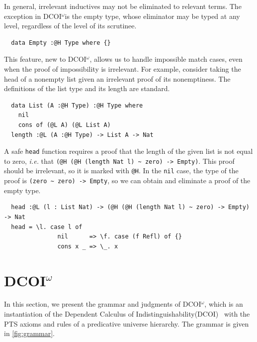 \documentclass[acmsmall]{acmart}
\makeatletter
\theoremstyle{linked}
\theoremstyle{deflinked}
\theoremstyle{acmdefinition}
\newcommand{\dcoi}{DCOI\@\xspace}
\newcommand{\name}{\texorpdfstring{DCOI$^{\omega}$\@\xspace}{DCOI-omega}}
\newcommand{\longname}{Dependent Calculus of Indistinguishability\@\xspace}
\makeatother
\begin{document}
In general, irrelevant inductives may not be eliminated to relevant terms.
The exception in \name is the empty type,
whose eliminator may be typed at any level,
regardless of the level of its scrutinee.
\begin{lstlisting}
  data Empty :@H Type where {}
\end{lstlisting}
\noindent
This feature, new to \name, allows us to handle impossible match cases,
even when the proof of impossibility is irrelevant.
For example, consider taking the head of a nonempty list
given an irrelevant proof of its nonemptiness. The definitions of the
list type and its length are standard.

\begin{lstlisting}
  data List (A :@H Type) :@H Type where
    nil
    cons of (@L A) (@L List A)
  length :@L (A :@H Type) -> List A -> Nat
\end{lstlisting}

A safe \lstinline{head} function requires a proof
that the length of the given list is not equal to zero, \emph{i.e.} that
\lstinline{(@H (@H (length Nat l) ~ zero) -> Empty)}. This proof
should be irrelevant, so it is marked with \lstinline{@H}.
In the \lstinline{nil} case, the type of the proof is
\lstinline{(zero ~ zero) -> Empty},
so we can obtain and eliminate a proof of the empty type.

\begin{lstlisting}
  head :@L (l : List Nat) -> (@H (@H (length Nat l) ~ zero) -> Empty) -> Nat
  head = \l. case l of
               nil      => \f. case (f Refl) of {}
               cons x _ => \_. x
\end{lstlisting}

\section{\name}

In this section, we present the grammar and judgments of \name,
which is an instantiation of the \longname (\dcoi)~\citep{liu:dcoi} with
the PTS axioms and rules of a predicative universe hierarchy.
The grammar is given in \cref{fig:grammar}.
\end{document}
